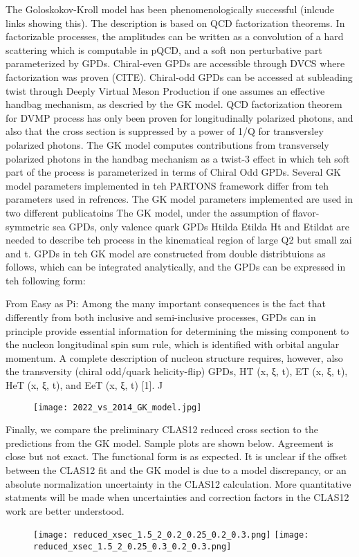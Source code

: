 The Goloskokov-Kroll model has been phenomenologically successful (inlcude links showing this).  The description is based on QCD factorization theorems. In factorizable processes, the amplitudes can be written as a convolution of a hard scattering which is computable in pQCD, and a soft non perturbative part parameterized by GPDs. Chiral-even GPDs are accessible through DVCS where factorization was proven (CITE). Chiral-odd GPDs can be accessed at subleading twist through Deeply Virtual Meson Production if one assumes an effective handbag mechanism, as descried by the GK model. 
QCD factorization theorem for DVMP process has only been proven for longitudinally polarized photons, and also that the cross section is suppressed by a power of 1/Q for transversley polarized photons. 
The GK model computes contributions from transversely polarized photons in the handbag mechanism as a twist-3 effect in which teh soft part of the process is parameterized in terms of Chiral Odd GPDs.
Several GK model parameters implemented in teh PARTONS framework differ from teh parameters used in refrences. The GK model parameters implemented are used in two different publicatoins
The GK model, under the assumption of flavor-symmetric sea GPDs, only valence quark GPDs Htilda Etilda Ht and Etildat are needed to describe teh process in the kinematical region of large Q2 but small zai and t. GPDs in teh GK model are constructed from double distribtuions as follows, which can be integrated analytically, and the GPDs can be expressed in teh following form:


From Easy as Pi:
Among the many important consequences is the fact that differently from both inclusive and semi-inclusive processes, GPDs can in principle provide essential information
for determining the missing component to the nucleon longitudinal spin sum rule, which
is identified with orbital angular momentum. A complete description of nucleon structure
requires, however, also the transversity (chiral odd/quark helicity-flip) GPDs, HT (x, ξ, t),
ET (x, ξ, t), HeT (x, ξ, t), and EeT (x, ξ, t) [1]. J


\begin{figure}[hbt]
	\centering
	\texttt{[image: 2022\_vs\_2014\_GK\_model.jpg]}
\end{figure}\label{fig:oldres2}

Finally, we compare the preliminary CLAS12 reduced cross section to the predictions from the GK model. Sample plots are shown below. Agreement is close but not exact. The functional form is as expected. It is unclear if the offset between the CLAS12 fit and the GK model is due to a model discrepancy, or an absolute normalization uncertainty in the CLAS12 calculation. More quantitative statments will be made when uncertainties and correction factors in the CLAS12 work are better understood.
\begin{figure}[hbt]
	\centering
	\texttt{[image: reduced\_xsec\_1.5\_2\_0.2\_0.25\_0.2\_0.3.png]}
	\texttt{[image: reduced\_xsec\_1.5\_2\_0.25\_0.3\_0.2\_0.3.png]}
\end{figure}\label{fig:oldres}


\begin{figure}[hbt]
	\centering
	
\end{figure}\label{fig:oldres}

